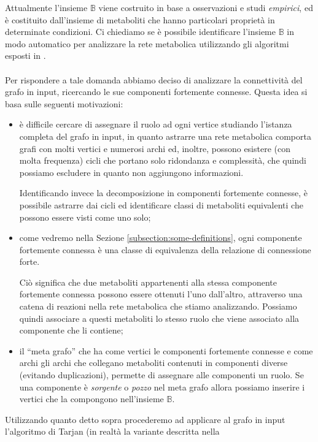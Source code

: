 Attualmente l'insieme $\mathbb{B}$ viene costruito in base a
osservazioni e studi \emph{empirici}, ed \`e costituito dall'insieme
di metaboliti che hanno particolari propriet\`a in determinate
condizioni.  Ci chiediamo se \`e possibile identificare l'insieme
$\mathbb{B}$ in modo automatico per analizzare la rete metabolica
utilizzando gli algoritmi esposti in \cite{tellingStories}.
\\\\
Per rispondere a tale domanda abbiamo deciso di analizzare la
connettivit\`a del grafo in input, ricercando le sue componenti
fortemente connesse. Questa idea si basa sulle seguenti motivazioni:
\begin{itemize}
\item \`e difficile cercare di assegnare il ruolo ad ogni vertice
  studiando l'istanza completa del grafo in input, in quanto astrarre
  una rete metabolica comporta grafi con molti vertici e numerosi
  archi ed, inoltre, possono esistere (con molta frequenza) cicli che
  portano solo ridondanza e complessit\`a, che quindi possiamo
  escludere in quanto non aggiungono informazioni.

  Identificando invece la decomposizione in componenti fortemente
  connesse, \`e possibile astrarre dai cicli ed identificare classi di
  metaboliti equivalenti che possono essere visti come uno solo;
\item come vedremo nella Sezione \ref{subsection:some-definitions},
  ogni componente fortemente connessa \`e una classe di equivalenza
  della relazione di connessione forte. 

  Ci\`o significa che due metaboliti appartenenti alla stessa
  componente fortemente connessa possono essere ottenuti l'uno
  dall'altro, attraverso una catena di reazioni nella rete metabolica
  che stiamo analizzando. Possiamo quindi associare a questi
  metaboliti lo stesso ruolo che viene associato alla componente che
  li contiene;
\item il ``meta grafo'' che ha come vertici le componenti fortemente
  connesse e come archi gli archi che collegano metaboliti contenuti
  in componenti diverse (evitando duplicazioni), permette di assegnare
  alle componenti un ruolo. Se una componente \`e \emph{sorgente} o
  \emph{pozzo} nel meta grafo allora possiamo inserire i vertici che
  la compongono nell'insieme $\mathbb{B}$.
\end{itemize}
Utilizzando quanto detto sopra procederemo ad applicare al grafo in
input l'algoritmo di Tarjan (in realt\`a la variante descritta nella
